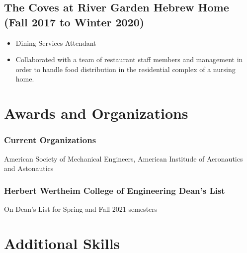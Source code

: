 \documentclass{article}
\newcommand{\sectionspacing}{\vspace{-.2em}} %
\newenvironment{CustomItemize}
{ \begin{itemize}[leftmargin=1em]
    \setlength{\itemsep}{0pt}
    \setlength{\parskip}{0pt}
    \setlength{\parindent}{0pt}
    \setlength{\parsep}{0pt}     }
{ \end{itemize}                  }
\begin{document}
\subsection{The Coves at River Garden Hebrew Home (Fall 2017 to Winter 2020)}
\begin{CustomItemize}
\item Dining Services Attendant
\item Collaborated with a team of restaurant staff members and management in order to handle food distribution in the residential complex of a nursing home.
\end{CustomItemize}

\sectionspacing{}
\section{Awards and Organizations}

\subsubsection{Current Organizations}
American Society of Mechanical Engineers,
American Institude of Aeronautics and Astonautics

\subsubsection{Herbert Wertheim College of Engineering Dean's List}
On Dean's List for Spring and Fall 2021 semesters

\sectionspacing{}
\section{Additional Skills}
\end{document}
